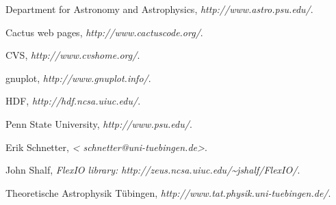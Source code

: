 
\begin{thebibliography}{{Pen}}

{Department for} Astronomy and Astrophysics,
  \emph{{http://www.astro.psu.edu/}}.

{Cactus web pages}, \emph{{http://www.cactuscode.org/}}.

CVS, \emph{{http://www.cvshome.org/}}.

gnuplot, \emph{{http://www.gnuplot.info/}}.

HDF, \emph{{http://hdf.ncsa.uiuc.edu/}}.

{Penn State University}, \emph{{http://www.psu.edu/}}.

Erik Schnetter, \emph{{\textless
  schnetter@uni-tuebingen.de\textgreater}}.

John Shalf, \emph{{FlexIO} library:
  {http://zeus.ncsa.uiuc.edu/\textasciitilde jshalf/FlexIO/}}.

Theoretische Astrophysik T\"ubingen,
  \emph{{http://www.tat.physik.uni-tuebingen.de/}}.

\end{thebibliography}



